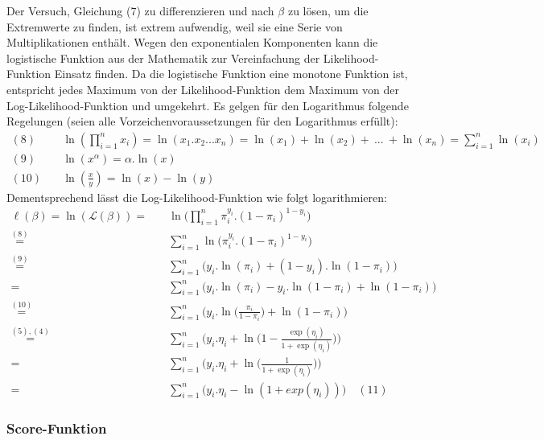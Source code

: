 \documentclass[12pt,]{article}
\begin{document}
Der Versuch, Gleichung (7) zu differenzieren und nach \(\beta\) zu
lösen, um die Extremwerte zu finden, ist extrem aufwendig, weil sie eine
Serie von Multiplikationen enthält. Wegen den exponentialen Komponenten
kann die logistische Funktion aus der Mathematik zur Vereinfachung der
Likelihood-Funktion Einsatz finden. Da die logistische Funktion eine
monotone Funktion ist, entspricht jedes Maximum von der
Likelihood-Funktion dem Maximum von der Log-Likelihood-Funktion und
umgekehrt. Es gelgen für den Logarithmus folgende Regelungen (seien alle
Vorzeichenvoraussetzungen für den Logarithmus erfüllt): \[
\begin{aligned}
(8) \quad &\ln(\prod_{i=1}^{n}x_i) = \ln(x_1.x_2...x_n) = \ln(x_1) + \ln(x_2) + \ ... \ + \ln(x_n) = \sum_{i=1}^{n} \ln(x_i) \\
(9) \quad &\ln(x^\alpha) = \alpha.\ln(x) \\
(10) \quad &\ln(\frac{x}{y}) = \ln(x) - \ln(y)
\end{aligned} 
\] Dementsprechend lässt die Log-Likelihood-Funktion wie folgt
logarithmieren: \[
\begin{aligned}
\ell(\beta) = \ln(\mathcal{L}(\beta)) = \quad &\ln \Bigg( \prod_{i=1}^{n} \pi_i^{y_i}.(1-\pi_i)^{1-y_i} \Bigg) \\
\mathrel{\overset{(8)}{=}} \quad &\sum_{i = 1}^{n} \ln \Big(\pi_i^{y_i}.(1-\pi_i)^{1-y_i}\Big) \\
\mathrel{\overset{(9)}{=}} \quad &\sum_{i = 1}^{n} \Big( y_i.\ln(\pi_i) + (1-y_i).\ln(1-\pi_i) \Big) \\
= \quad &\sum_{i = 1}^{n} \Big( y_i.\ln(\pi_i) - y_i.\ln(1-\pi_i) + \ln(1-\pi_i) \Big) \\
\mathrel{\overset{(10)}{=}} \quad &\sum_{i = 1}^{n} \Bigg( y_i.\ln \Big(\frac{\pi_i}{1-\pi_i}\Big) + \ln(1-\pi_i) \Bigg) \\
\mathrel{\overset{(5),(4)}{=}} \ &\sum_{i = 1}^{n} \Bigg( y_i.\eta_i + \ln \Big( 1- \frac{\exp(\eta_i)}{1 + \exp(\eta_i)} \Big) \Bigg) \\
= \quad &\sum_{i = 1}^{n} \Bigg( y_i.\eta_i + \ln \Big( \frac{1}{1+\exp(\eta_i)}\Big) \Bigg) \\
= \quad &\sum_{i = 1}^{n} \Big( y_i.\eta_i - \ln (1 + exp(\eta_i)) \Big) \quad (11)
\end{aligned}
\]

\subsubsection{Score-Funktion}\label{score-funktion}
\end{document}
